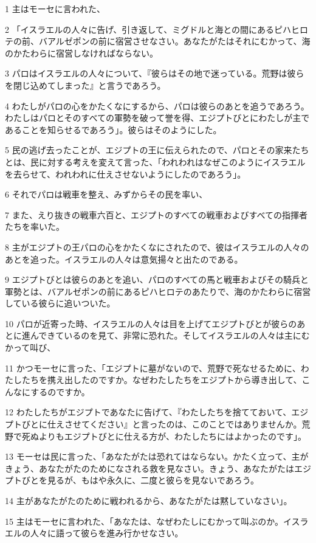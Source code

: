 \par 1 主はモーセに言われた、
\par 2 「イスラエルの人々に告げ、引き返して、ミグドルと海との間にあるピハヒロテの前、バアルゼポンの前に宿営させなさい。あなたがたはそれにむかって、海のかたわらに宿営しなければならない。
\par 3 パロはイスラエルの人々について、『彼らはその地で迷っている。荒野は彼らを閉じ込めてしまった』と言うであろう。
\par 4 わたしがパロの心をかたくなにするから、パロは彼らのあとを追うであろう。わたしはパロとそのすべての軍勢を破って誉を得、エジプトびとにわたしが主であることを知らせるであろう」。彼らはそのようにした。
\par 5 民の逃げ去ったことが、エジプトの王に伝えられたので、パロとその家来たちとは、民に対する考えを変えて言った、「われわれはなぜこのようにイスラエルを去らせて、われわれに仕えさせないようにしたのであろう」。
\par 6 それでパロは戦車を整え、みずからその民を率い、
\par 7 また、えり抜きの戦車六百と、エジプトのすべての戦車およびすべての指揮者たちを率いた。
\par 8 主がエジプトの王パロの心をかたくなにされたので、彼はイスラエルの人々のあとを追った。イスラエルの人々は意気揚々と出たのである。
\par 9 エジプトびとは彼らのあとを追い、パロのすべての馬と戦車およびその騎兵と軍勢とは、バアルゼポンの前にあるピハヒロテのあたりで、海のかたわらに宿営している彼らに追いついた。
\par 10 パロが近寄った時、イスラエルの人々は目を上げてエジプトびとが彼らのあとに進んできているのを見て、非常に恐れた。そしてイスラエルの人々は主にむかって叫び、
\par 11 かつモーセに言った、「エジプトに墓がないので、荒野で死なせるために、わたしたちを携え出したのですか。なぜわたしたちをエジプトから導き出して、こんなにするのですか。
\par 12 わたしたちがエジプトであなたに告げて、『わたしたちを捨てておいて、エジプトびとに仕えさせてください』と言ったのは、このことではありませんか。荒野で死ぬよりもエジプトびとに仕える方が、わたしたちにはよかったのです」。
\par 13 モーセは民に言った、「あなたがたは恐れてはならない。かたく立って、主がきょう、あなたがたのためになされる救を見なさい。きょう、あなたがたはエジプトびとを見るが、もはや永久に、二度と彼らを見ないであろう。
\par 14 主があなたがたのために戦われるから、あなたがたは黙していなさい」。
\par 15 主はモーセに言われた、「あなたは、なぜわたしにむかって叫ぶのか。イスラエルの人々に語って彼らを進み行かせなさい。
